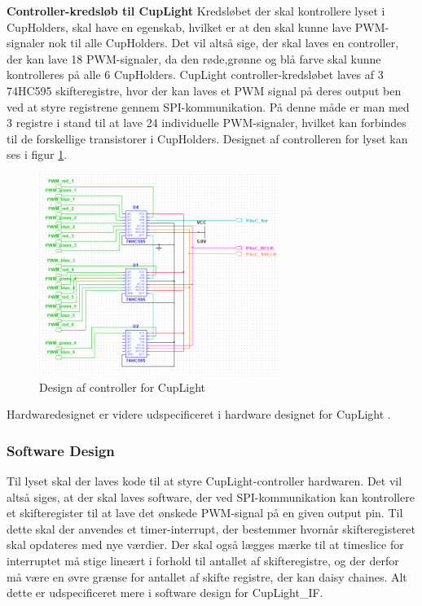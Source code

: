 \documentclass[Rapport/Rapport_main.tex]{subfiles}
\begin{document}
\textbf{Controller-kredsløb til CupLight}
Kredsløbet der skal kontrollere lyset i CupHolders, skal have en egenskab, hvilket er at den skal kunne lave PWM-signaler nok til alle CupHolders. Det vil altså sige, der skal laves en controller, der kan lave 18 PWM-signaler, da den røde,grønne og blå farve skal kunne kontrolleres på alle 6 CupHolders.
CupLight controller-kredsløbet laves af 3 74HC595 skifteregistre, hvor der kan laves et PWM signal på deres output ben ved at styre registrene gennem SPI-kommunikation. På denne måde er man med 3 registre i stand til at lave 24 individuelle PWM-signaler, hvilket kan forbindes til de forskellige transistorer i CupHolders. Designet af controlleren for lyset kan ses i figur \ref{fig:rap_cuplight_controller}.
\begin{figure}[H]
    \centering
    \includegraphics[width=0.7\textwidth]{HardwareDesign/CupLight/graphics/CupLight_HW_Controller.png}
    \caption{Design af controller for CupLight}
    \label{fig:rap_cuplight_controller}
\end{figure}
Hardwaredesignet er videre udspecificeret i hardware designet for CupLight \fullref{}.
\subsubsection{Software Design}
Til lyset skal der laves kode til at styre CupLight-controller hardwaren. Det vil altså siges, at der skal laves software, der ved SPI-kommunikation kan kontrollere et skifteregister til at lave det ønskede PWM-signal på en given output pin. Til dette skal der anvendes et timer-interrupt, der bestemmer hvornår skifteregisteret skal opdateres med nye værdier. Der skal også lægges mærke til at timeslice for interruptet må stige lineært i forhold til antallet af skifteregistre, og der derfor må være en øvre grænse for antallet af skifte registre, der kan daisy chaines. 
Alt dette er udspecificeret mere i software design for CupLight\_IF.
\end{document}
